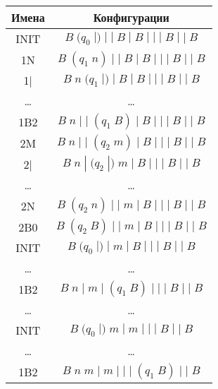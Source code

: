 \documentclass[a4paper, 12pt]{article}  %
\theoremstyle{definition}
\begin{document}
	\begin{multicols}{2}		
		\begin{tabular}{ | c | c | }
			\hline
			Имена & Конфигурации \\ 
			\hline
			INIT & $B \; (q_0 \; |) \; | \; | \; B\; | \;  B \; | \; | \; | \; B \; | \; | \;  B$ \\
			1N & $B \; (q_1 \; n) \; | \; | \; B\; | \;  B \; | \; | \; | \; B \; | \; | \;  B$ \\
			1| & $B \;  n \;(q_1 \; |) \; | \; B\; | \;  B \; | \; | \; | \; B \; | \; | \;  B$ \\
			\dots & \dots \\
			1B2 & $B \;  n \; | \; | \; (q_1 \; B) \; | \;  B \; | \; | \; | \; B \; | \; | \;  B$ \\
			2M & $B \;  n \; | \; | \; (q_2 \; m) \; | \;  B \; | \; | \; | \; B \; | \; | \;  B$ \\
			2| & $B \;  n \; | \; (q_2 \; |) \;  m \; | \;  B \; | \; | \; | \; B \; | \; | \;  B$ \\
			\dots & \dots \\
			2N & $B \;  (q_2 \; n) \; | \;  | \;  m \; | \;  B \; | \; | \; | \; B \; | \; | \;  B$ \\
			2B0 & $B \;  (q_2 \; B) \; | \;  | \;  m \; | \;  B \; | \; | \; | \; B \; | \; | \;  B$ \\
			INIT & $ B \; (q_0 \; |) \;  | \;  m \; | \;  B \; | \; | \; | \; B \; | \; | \;  B$ \\
			\dots & \dots \\
			1B2 & $ B \;  n \;   | \;  m \;  | \; (q_1 \; B) \; | \; | \; | \; B \; | \; | \;  B$ \\
			\dots & \dots \\
			INIT & $ B \; (q_0 \;  |) \;  m \;  | \;  m \; | \; | \; | \; B \; | \; | \;  B$ \\
			\dots & \dots \\
			1B2 & $ B \;  n \;  m \;  | \; m \; | \; | \; | \; (q_1 \; B) \; | \; | \;  B$ \\

\end{tabular}
\end{multicols}
\end{document}
